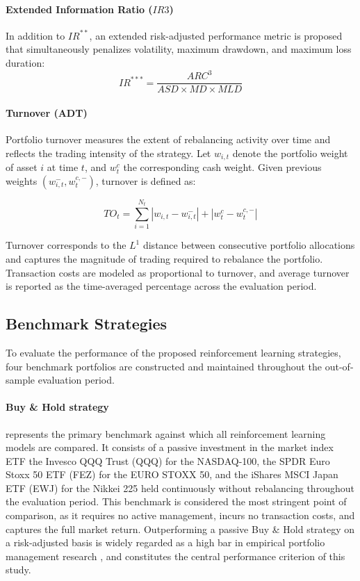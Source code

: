 \documentclass[]{elsarticle}
\begin{document}
\paragraph{Extended Information Ratio (\(IR3\))}
In addition to \(IR^{**}\), an extended risk-adjusted performance metric is 
proposed that simultaneously penalizes volatility, maximum drawdown, and 
maximum loss duration:
\begin{equation}
\label{eq:ir3}
IR^{***} = \frac{ARC^3}{ASD \times MD \times MLD}
\end{equation}

\paragraph{Turnover (ADT)}
Portfolio turnover measures the extent of rebalancing activity over time and reflects the trading intensity of the strategy. Let $w_{i,t}$ denote the portfolio weight of asset $i$ at time $t$, and $w^{c}_{t}$ the corresponding cash weight. Given previous weights $(w^{-}_{i,t}, w^{c,-}_{t})$, turnover is defined as:

\begin{equation}
\label{eq:turnover}
TO_t = \sum_{i=1}^{N_t} |w_{i,t} - w^{-}_{i,t}| + |w^{c}_{t} - w^{c,-}_{t}|
\end{equation}

Turnover corresponds to the $L^1$ distance between consecutive portfolio allocations and captures the magnitude of trading required to rebalance the portfolio. Transaction costs are modeled as proportional to turnover, and average turnover is reported as the time-averaged percentage across the evaluation period.

\hypertarget{sec:benchmarks}{%
\subsection{Benchmark Strategies}\label{sec:benchmarks}}

To evaluate the performance of the proposed reinforcement learning strategies, four benchmark portfolios are constructed and maintained throughout the out-of-sample evaluation period.

\paragraph{Buy \& Hold strategy}  represents the primary benchmark against which all reinforcement learning models are compared. It consists of a passive investment in the market index ETF the Invesco QQQ Trust (QQQ) for the NASDAQ-100, the SPDR Euro Stoxx 50 ETF (FEZ) for the EURO STOXX 50, and the iShares MSCI Japan ETF (EWJ) for the Nikkei 225 held continuously without rebalancing throughout the evaluation period. This benchmark is considered the most stringent point of comparison, as it requires no active management, incurs no transaction costs, and captures the full market return. Outperforming a passive Buy \& Hold strategy on a risk-adjusted basis is widely regarded as a high bar in empirical portfolio management research \citep{DE_MIGEUL}, and constitutes the central performance criterion of this study.
\end{document}
